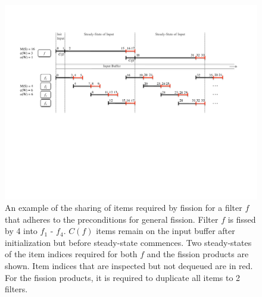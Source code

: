 \documentclass[]{article}
\begin{document}
\begin{figure}
\centering
\includegraphics[width=\textwidth]{fission-sharing2.pdf}
\caption[Another example of the sharing required by fission.]  { An
  example of the sharing of items required by fission for a filter $f$
  that adheres to the preconditions for general fission.  Filter $f$
  is fissed by 4 into $f_1$ - $f_4$.  $C(f)$ items remain on the input
  buffer after initialization but before steady-state commences. Two
  steady-states of the item indices required for both $f$ and the
  fission products are shown.  Item indices that are inspected but not
  dequeued are in red.  For the fission products, it is required to
  duplicate all items to 2 filters.
  \label{fig:fission-sharing2}}
\end{figure}
\end{document}
